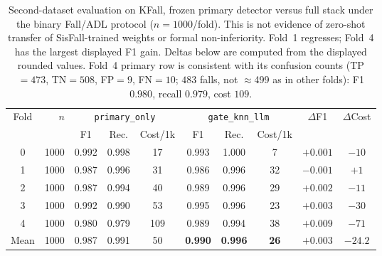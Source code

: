 \begin{table}[!t]
\centering
\caption{Second-dataset evaluation on KFall, frozen primary detector versus full stack under the binary Fall/ADL protocol ($n{=}1000$/fold). This is not evidence of zero-shot transfer of SisFall-trained weights or formal non-inferiority. Fold~1 regresses; Fold~4 has the largest displayed F1 gain. Deltas below are computed from the displayed rounded values. Fold~4 primary row is consistent with its confusion counts (TP${=}473$, TN${=}508$, FP${=}9$, FN${=}10$; $483$ falls, not $\approx$499 as in other folds): F1 $0.980$, recall $0.979$, cost $109$.}
\label{tab:kfallperfold}
\begin{tabular}{c r ccc ccc cc}
\toprule
Fold & $n$ & \multicolumn{3}{c}{\texttt{primary\_only}} & \multicolumn{3}{c}{\texttt{gate\_knn\_llm}} & $\Delta$F1 & $\Delta$Cost \\
\cmidrule(lr){3-5}\cmidrule(lr){6-8}
 & & F1 & Rec. & Cost/1k & F1 & Rec. & Cost/1k & & \\
\midrule
0 & 1000 & 0.992 & 0.998 & 17  & 0.993 & 1.000 & 7  & $+0.001$ & $-10$ \\
1 & 1000 & 0.987 & 0.996 & 31  & 0.986 & 0.996 & 32 & $-0.001$ & $+1$  \\
2 & 1000 & 0.987 & 0.994 & 40  & 0.989 & 0.996 & 29 & $+0.002$ & $-11$ \\
3 & 1000 & 0.992 & 0.990 & 53  & 0.995 & 0.996 & 23 & $+0.003$ & $-30$ \\
4 & 1000 & 0.980 & 0.979 & 109 & 0.989 & 0.994 & 38 & $+0.009$ & $-71$ \\
\midrule
Mean & 1000 & 0.987 & 0.991 & 50 & \textbf{0.990} & \textbf{0.996} & \textbf{26} & $+0.003$ & $-24.2$ \\
\bottomrule
\end{tabular}
\end{table}

